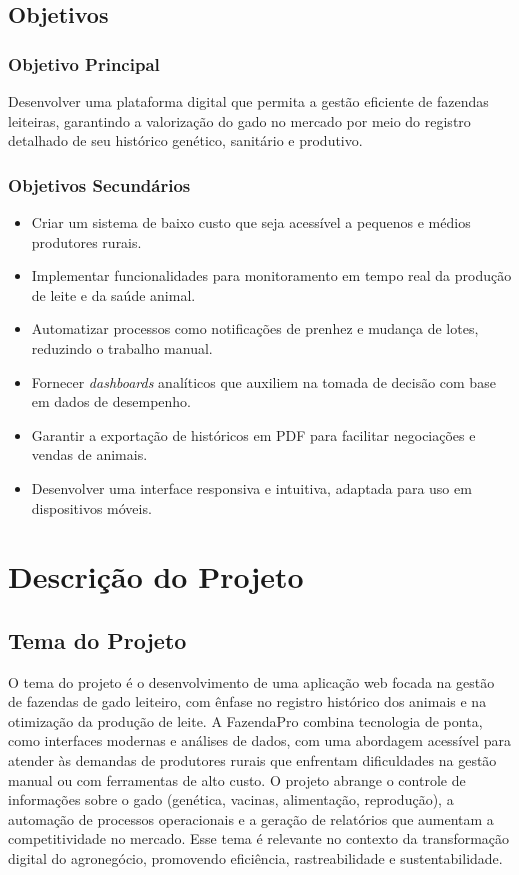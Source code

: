 \documentclass[12pt, a4paper]{article}
\begin{document}
\subsection{Objetivos}
\begin{spacing}{1.5}
\subsubsection{Objetivo Principal}
Desenvolver uma plataforma digital que permita a gestão eficiente de fazendas leiteiras, garantindo a valorização do gado no mercado por meio do registro detalhado de seu histórico genético, sanitário e produtivo.

\subsubsection{Objetivos Secundários}
\begin{itemize}
    \item Criar um sistema de baixo custo que seja acessível a pequenos e médios produtores rurais.
    \item Implementar funcionalidades para monitoramento em tempo real da produção de leite e da saúde animal.
    \item Automatizar processos como notificações de prenhez e mudança de lotes, reduzindo o trabalho manual.
    \item Fornecer \textit{dashboards} analíticos que auxiliem na tomada de decisão com base em dados de desempenho.
    \item Garantir a exportação de históricos em PDF para facilitar negociações e vendas de animais.
    \item Desenvolver uma interface responsiva e intuitiva, adaptada para uso em dispositivos móveis.
\end{itemize}
\end{spacing}

\section{Descrição do Projeto}

\subsection{Tema do Projeto}
\begin{spacing}{1.5}
O tema do projeto é o desenvolvimento de uma aplicação web focada na gestão de fazendas de gado leiteiro, com ênfase no registro histórico dos animais e na otimização da produção de leite. A FazendaPro combina tecnologia de ponta, como interfaces modernas e análises de dados, com uma abordagem acessível para atender às demandas de produtores rurais que enfrentam dificuldades na gestão manual ou com ferramentas de alto custo. O projeto abrange o controle de informações sobre o gado (genética, vacinas, alimentação, reprodução), a automação de processos operacionais e a geração de relatórios que aumentam a competitividade no mercado. Esse tema é relevante no contexto da transformação digital do agronegócio, promovendo eficiência, rastreabilidade e sustentabilidade.
\end{spacing}
\end{document}
